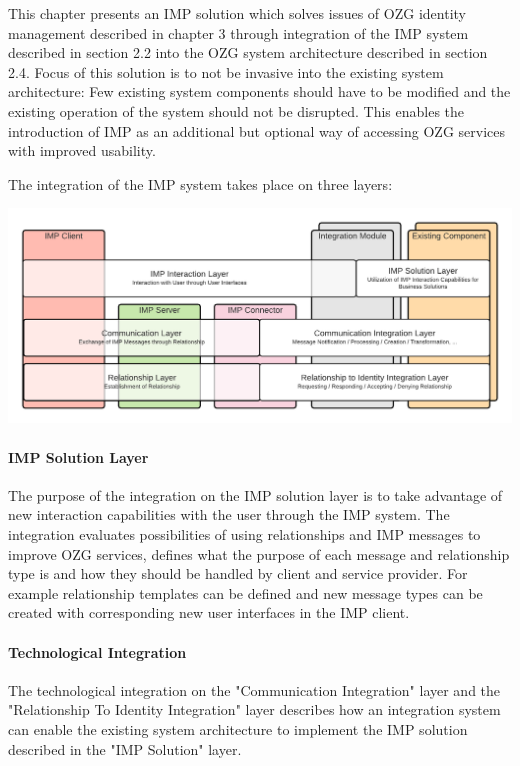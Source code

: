 This chapter presents an IMP solution which solves issues of OZG identity management described in chapter 3 through integration of the IMP system described in section 2.2 into the OZG system architecture described in section 2.4. Focus of this solution is to not be invasive into the existing system architecture: Few existing system components should have to be modified and the existing operation of the system should not be disrupted. This enables the introduction of IMP as an additional but optional way of accessing OZG services with improved usability.

The integration of the IMP system takes place on three layers:

\begin{center}
    \includegraphics[scale=0.6]{Diagrams/Integration Architecture 1/IMP Layer Diagram Integration.pdf}
\end{center}

\paragraph{IMP Solution Layer} 
The purpose of the integration on the IMP solution layer is to take advantage of new interaction capabilities with the user through the IMP system. The integration evaluates possibilities of using relationships and IMP messages to improve OZG services, defines what the purpose of each message and relationship type is and how they should be handled by client and service provider. For example relationship templates can be defined and new message types can be created with corresponding new user interfaces in the IMP client.

\paragraph{Technological Integration} The technological integration on the "Communication Integration" layer and the "Relationship To Identity Integration" layer describes how an integration system can enable the existing system architecture to implement the IMP solution described in the "IMP Solution" layer.

